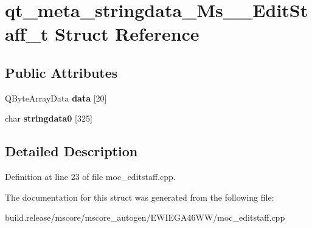 \hypertarget{structqt__meta__stringdata___ms_____edit_staff__t}{}\section{qt\+\_\+meta\+\_\+stringdata\+\_\+\+Ms\+\_\+\+\_\+\+Edit\+Staff\+\_\+t Struct Reference}
\label{structqt__meta__stringdata___ms_____edit_staff__t}
\subsection*{Public Attributes}
\begin{DoxyCompactItemize}
\item 
\mbox{\label{structqt__meta__stringdata___ms_____edit_staff__t_ac5487c9fc38c48a515b6b24e38c5c18c}} 
Q\+Byte\+Array\+Data {\bfseries data} \mbox{[}20\mbox{]}
\item 
\mbox{\label{structqt__meta__stringdata___ms_____edit_staff__t_a12098f1715f1521320ba179bac06cad5}} 
char {\bfseries stringdata0} \mbox{[}325\mbox{]}
\end{DoxyCompactItemize}


\subsection{Detailed Description}


Definition at line 23 of file moc\+\_\+editstaff.\+cpp.



The documentation for this struct was generated from the following file\+:\begin{DoxyCompactItemize}
\item 
build.\+release/mscore/mscore\+\_\+autogen/\+E\+W\+I\+E\+G\+A46\+W\+W/moc\+\_\+editstaff.\+cpp\end{DoxyCompactItemize}
